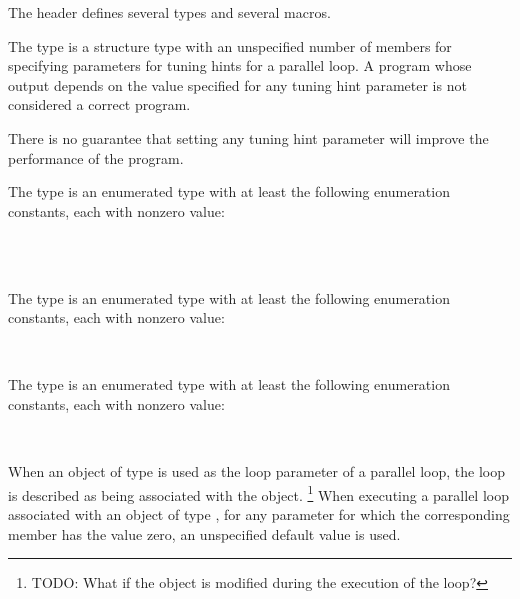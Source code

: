 

\pnum
The header
defines several types and several macros.

\pnum
The
type is a structure type
with an unspecified number of members
for specifying parameters for tuning hints for a parallel loop.
A program whose output
depends on the value specified for any tuning hint parameter
is not considered a correct program.

\begin{note}
There is no guarantee that setting any tuning hint parameter
will improve the performance of the program.
\end{note}

\pnum
The
type is an enumerated type
with at least the following enumeration constants,
each with nonzero value:

\begin{ttfamily}
\\
\\
\end{ttfamily}

\pnum
The
type is an enumerated type
with at least the following enumeration constants,
each with nonzero value:

\begin{ttfamily}
\\
\end{ttfamily}

\pnum
The
type is an enumerated type
with at least the following enumeration constants,
each with nonzero value:

\begin{ttfamily}
\\
\end{ttfamily}

\pnum
When an object of type
is used as the loop parameter of a parallel loop,
the loop is described as being associated with the object.%
\footnote{TODO:
What if the object is modified during the execution of the loop?
}
When executing a parallel loop associated with an object of type
,
for any parameter for which the corresponding member has the value zero,
an unspecified default value is used.

